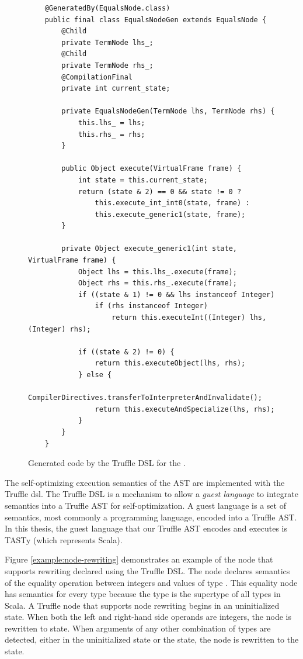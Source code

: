 \begin{figure}[!htb]
\begin{verbatim}
	@GeneratedBy(EqualsNode.class)
	public final class EqualsNodeGen extends EqualsNode {
		@Child
		private TermNode lhs_;
		@Child
		private TermNode rhs_;
		@CompilationFinal
		private int current_state;
		
		private EqualsNodeGen(TermNode lhs, TermNode rhs) {
			this.lhs_ = lhs;
			this.rhs_ = rhs;
		}
		
		public Object execute(VirtualFrame frame) {
			int state = this.current_state;
			return (state & 2) == 0 && state != 0 ? 
				this.execute_int_int0(state, frame) : 
				this.execute_generic1(state, frame);
		}
	
		private Object execute_generic1(int state, VirtualFrame frame) {
			Object lhs = this.lhs_.execute(frame);
			Object rhs = this.rhs_.execute(frame);
			if ((state & 1) != 0 && lhs instanceof Integer) 
				if (rhs instanceof Integer) 
					return this.executeInt((Integer) lhs, (Integer) rhs);
			
			if ((state & 2) != 0) {
				return this.executeObject(lhs, rhs);
			} else {
				CompilerDirectives.transferToInterpreterAndInvalidate();
				return this.executeAndSpecialize(lhs, rhs);
			}
		}	
	}
\end{verbatim}
\caption{Generated code by the Truffle DSL for the .}
\label{impl:node-rewriting-gen}
\end{figure}

The self-optimizing execution semantics of the AST are implemented with the Truffle \acrfull{dsl}.
The Truffle DSL is a mechanism to allow a \textit{guest language} to integrate semantics into a Truffle AST for self-optimization.
A guest language is a set of semantics, most commonly a programming language, encoded into a Truffle AST.
In this thesis, the guest language that our Truffle AST encodes and executes is TASTy (which represents Scala).

Figure \ref{example:node-rewriting} demonstrates an example of the node that supports rewriting declared using the Truffle DSL.
The node declares semantics of the equality operation between integers and values of type .
This equality node has semantics for every type because the  type is the supertype of all types in Scala.
A Truffle node that supports node rewriting begins in an uninitialized state.
When both the left and right-hand side operands are integers, the node is rewritten to  state.
When arguments of any other combination of types are detected, either in the uninitialized state or the  state, the node is rewritten to the  state.

